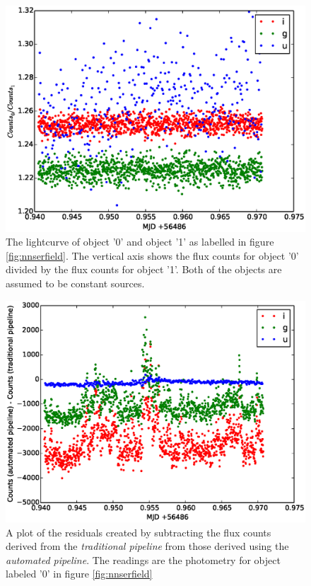 \begin{figure}[!h]
\centering
\includegraphics[width=140mm]{images/differential_auto.eps}
\caption{The lightcurve of object '0' and object '1' as labelled in figure \ref{fig:nnserfield}. The vertical axis shows the flux counts for object '0' divided by the flux counts for object '1'. Both of the objects are assumed to be constant sources. }
\label{fig:differentialauto}
\end{figure}


\begin{figure}[!h]
\centering
\includegraphics[width=140mm]{images/residuals.eps}
\caption{A plot of the residuals created by subtracting the flux counts derived from the \emph{traditional pipeline} from those derived using the \emph{automated pipeline}. The readings are the photometry for object labeled '0' in figure \ref{fig:nnserfield}}
\label{fig:residualplot}
\end{figure}

